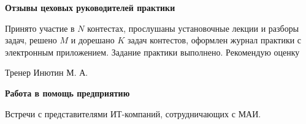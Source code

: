 \begin{center}
    \bfseries{\large Отзывы цеховых руководителей практики}
    \end{center}
    
    Принято участие в $N$ контестах, прослушаны установочные лекции и разборы задач, решено $M$ и дорешано $K$ задач контестов, оформлен журнал практики с электронным приложением. Задание практики выполнено. Рекомендую оценку
    
    \vspace{15pt}
    
    \hfill Тренер Инютин М. А. 
    
    \vspace{200pt}
    
    \begin{center}
    \bfseries{\large Работа в помощь предприятию}
    \end{center}
    
    Встречи с представителями ИТ-компаний, сотрудничающих с МАИ.
    
    \pagebreak